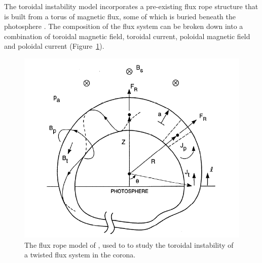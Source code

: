 The toroidal instability model incorporates a pre-existing flux rope structure that is built from a torus of magnetic flux, some of which is buried beneath the photosphere \citep{chen1989}. The composition of the flux system can be broken down into a combination of toroidal magnetic field, toroidal current, poloidal magnetic field and poloidal current (Figure~\ref{fig:chen_model}). 
\begin{figure}[!t]
\begin{center}
\includegraphics[scale=0.4, trim=0cm 1cm 0cm 1cm]{images/chen_model}
\caption[The toroidal instability CME model]{The flux rope model of \citet{chen1989}, used to to study the toroidal instability of a twisted flux system in the corona.}
\label{fig:chen_model}
\end{center}
\end{figure}
